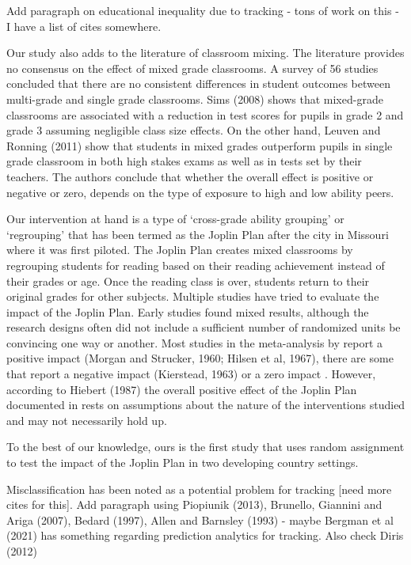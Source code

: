 \documentclass[11pt]{article}
\begin{document}
Add paragraph on educational inequality due to tracking - tons of work on this - I have a list of cites somewhere.  

Our study also adds to the literature of classroom mixing. The literature provides no consensus on the effect of mixed grade classrooms. A survey of 56 studies concluded that there are no consistent differences in student outcomes between multi-grade and single grade classrooms.  Sims (2008) shows that mixed-grade classrooms are associated with a reduction in test scores for pupils in grade 2 and grade 3 assuming negligible class size effects. On the other hand, Leuven and Ronning (2011) show that students in mixed grades outperform pupils in single grade classroom in both high stakes exams as well as in tests set by their teachers. The authors conclude that whether the overall effect is positive or negative or zero, depends on the type of exposure to high and low ability peers. 

Our intervention at hand is a type of `cross-grade ability grouping' or `regrouping' \citep{slavin:1987} that has been termed as the Joplin Plan \citep{floyd:1954} after the city in Missouri where it was first piloted. The Joplin Plan creates mixed classrooms by regrouping students for reading based on their reading achievement instead of their grades or age. Once the reading class is over, students return to their original grades for other subjects. Multiple studies have tried to evaluate the impact of the Joplin Plan. Early studies found mixed results, although the research designs often did not include a sufficient number of randomized units be convincing one way or another. Most studies in the meta-analysis by \cite{slavin:1987} report a positive impact (Morgan and Strucker, 1960; Hilsen et al, 1967), there are some that report a negative impact (Kierstead, 1963) or a zero impact \citep{carson/thompson:1964,powell:1964}. However, according to Hiebert (1987) the overall positive effect of the Joplin Plan documented in \cite{slavin:1987} rests on assumptions about the nature of the interventions studied and may not necessarily hold up. 

To the best of our knowledge, ours is the first study that uses random assignment to test the impact of the Joplin Plan in two developing country settings. 

Misclassification has been noted as a potential problem for tracking \citep{betts:2011} [need more cites for this]. Add paragraph using Piopiunik (2013), Brunello, Giannini and Ariga (2007), Bedard (1997), Allen and Barnsley (1993) - maybe Bergman et al (2021) has something regarding prediction analytics for tracking. Also check Diris (2012)
\end{document}
